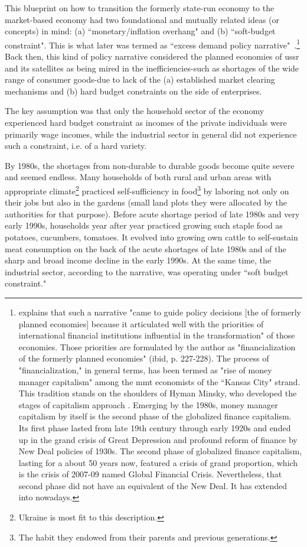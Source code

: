 This blueprint on how to transition the formerly state-run economy to the market-based economy had two foundational and mutually related ideas (or concepts) in mind: (a) ``monetary/inflation overhang" and (b) ``soft-budget constraint". This is what later was termed as ``excess demand policy narrative"~\citep[p.~228]{gabor2012}.\footnote{\cite{gabor2012} explains that such a narrative "came to guide policy decisions [the of formerly planned economies] because it articulated well with the priorities of international financial institutions influential in the transformation" of those economies. Those priorities are formulated by the author as "financialization of the formerly planned economies" (ibid, p. 227-228). The process of "financialization," in general terms, has been termed as "rise of money manager capitalism" among the \ac{mmt} economists of the ``Kansas City" strand. This tradition stands on the shoulders of Hyman Minsky, who developed the stages of capitalism approach \citep[see][]{wray2009,wray2020}.  Emerging by the 1980s, money manager capitalism by itself is the second phase of the globalized finance capitalism. Its first phase lasted from late 19th century through early 1920s and ended up in the grand crisis of Great Depression and profound reform of finance by New Deal policies of 1930s. The second phase of globalized finance capitalism, lasting for a about 50 years now, featured a crisis of grand proportion, which is the crisis of 2007-09 named Global Financial Crisis. Nevertheless, that second phase did not have an equivalent of the New Deal. It has extended into nowadays.} Back then, this kind of policy narrative  considered the planned economies of \ac{ussr} and its satellites as being mired in the inefficiencies-such as shortages of the wide range of consumer goods-due to lack of the (a) established market clearing mechanisms and (b) hard budget constraints on the side of enterprises. 

The key assumption was that only the household sector of the economy experienced hard budget constraint as incomes of the private individuals were primarily wage incomes, while the industrial sector in general did not experience such a constraint, i.e. of a hard variety.

By 1980s, the shortages from non-durable to durable goods become quite severe and seemed endless. Many households of both rural and urban areas with appropriate climate\footnote{Ukraine is most fit to this description.} practiced self-sufficiency in food\footnote{The habit they endowed from their parents and previous generations.} by laboring not only on their jobs but also in the gardens (small land plots they were allocated by the authorities for that purpose). Before acute shortage period of late 1980s and very early 1990s, households year after year practiced growing such staple food as potatoes, cucumbers, tomatoes. It evolved into growing own cattle to self-sustain meat consumption on the back of the acute shortages of late 1980s and of the sharp and broad income decline in the early 1990s. At the same time, the industrial sector, according to the narrative, was operating under ``soft budget constraint."

